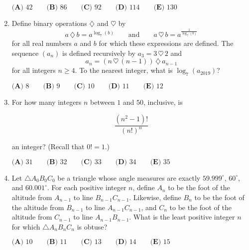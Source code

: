\documentclass{article}
\begin{document}
\begin{enumerate}[label=\arabic*., itemsep=0.5em]
$\textbf{(A) } 42 \qquad \textbf{(B) }86 \qquad \textbf{(C) } 92 \qquad \textbf{(D) } 114 \qquad \textbf{(E) } 130$\par \vspace{0.5em}\item Define binary operations $\diamondsuit$ and $\heartsuit$ by 
\begin{equation*}
a \, \diamondsuit \, b = a^{\log_{7}(b)} \qquad \text{and} \qquad a  \, \heartsuit \, b = a^{\frac{1}{\log_{7}(b)}}
\end{equation*}
for all real numbers $a$ and $b$ for which these expressions are defined. The sequence $(a_n)$ is defined recursively by $a_3 = 3\, \heartsuit\, 2$ and 
\begin{equation*}
a_n = (n\, \heartsuit\, (n-1)) \,\diamondsuit\, a_{n-1}
\end{equation*}
for all integers $n \geq 4$. To the nearest integer, what is $\log_{7}(a_{2019})$?

$\textbf{(A) } 8 \qquad  \textbf{(B) } 9 \qquad \textbf{(C) } 10 \qquad \textbf{(D) } 11 \qquad \textbf{(E) } 12$\par \vspace{0.5em}\item For how many integers $n$ between $1$ and $50$, inclusive, is

\begin{equation*}
\frac{(n^2-1)!}{(n!)^n}
\end{equation*}

an integer? (Recall that $0! = 1$.)

$\textbf{(A) } 31 \qquad \textbf{(B) } 32 \qquad \textbf{(C) } 33 \qquad \textbf{(D) } 34 \qquad \textbf{(E) } 35$\par \vspace{0.5em}\item Let $\triangle A_0B_0C_0$ be a triangle whose angle measures are exactly $59.999^\circ$, $60^\circ$, and $60.001^\circ$. For each positive integer $n$, define $A_n$ to be the foot of the altitude from $A_{n-1}$ to line $B_{n-1}C_{n-1}$. Likewise, define $B_n$ to be the foot of the altitude from $B_{n-1}$ to line $A_{n-1}C_{n-1}$, and $C_n$ to be the foot of the altitude from $C_{n-1}$ to line $A_{n-1}B_{n-1}$. What is the least positive integer $n$ for which $\triangle A_nB_nC_n$ is obtuse?

$\textbf{(A) } 10 \qquad \textbf{(B) }11 \qquad \textbf{(C) } 13\qquad \textbf{(D) } 14 \qquad \textbf{(E) } 15$\par \vspace{0.5em}\end{enumerate}
\end{document}
